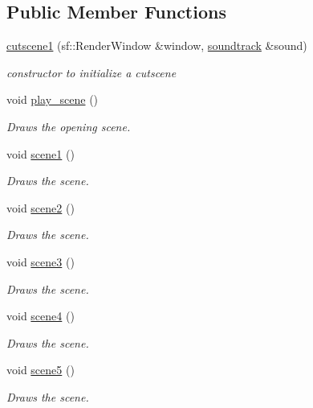 \subsection*{Public Member Functions}
\begin{DoxyCompactItemize}
\item 
\hyperlink{classcutscene1_acf92c92aba72e1858d7ace167c231ece}{cutscene1} (sf\+::\+Render\+Window \&window, \hyperlink{classsoundtrack}{soundtrack} \&sound)
\begin{DoxyCompactList}\small\item\em constructor to initialize a cutscene \end{DoxyCompactList}\item 
void \hyperlink{classcutscene1_af4c8e7ddc01274a70da482e1d7f56a14}{play\+\_\+scene} ()
\begin{DoxyCompactList}\small\item\em Draws the opening scene. \end{DoxyCompactList}\item 
void \hyperlink{classcutscene1_a169d9eef0707c691dbb2eb94ad07f844}{scene1} ()
\begin{DoxyCompactList}\small\item\em Draws the scene. \end{DoxyCompactList}\item 
void \hyperlink{classcutscene1_a8ccf64a236d3ddc02d9fe3c1c612495e}{scene2} ()
\begin{DoxyCompactList}\small\item\em Draws the scene. \end{DoxyCompactList}\item 
void \hyperlink{classcutscene1_a1d3f3933b12bc06b7384bb0f81b00bc0}{scene3} ()
\begin{DoxyCompactList}\small\item\em Draws the scene. \end{DoxyCompactList}\item 
void \hyperlink{classcutscene1_abbb516e182b20fe773d09419349ecbfe}{scene4} ()
\begin{DoxyCompactList}\small\item\em Draws the scene. \end{DoxyCompactList}\item 
void \hyperlink{classcutscene1_ace82590104cccbecfd5ec0b4bacaca91}{scene5} ()
\begin{DoxyCompactList}\small\item\em Draws the scene. \end{DoxyCompactList}\item 

\end{DoxyCompactItemize}
